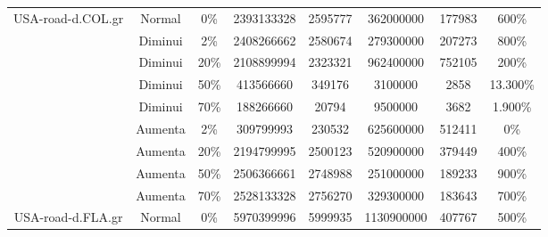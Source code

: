 \begin{table}[H]
\begin{adjustbox}{max width=\textwidth}
\begin{tabular}{|c|c|c|c|c|c|c|c|}
\multirow{9}{*}{USA-road-d.COL.gr} & Normal        & 0\%                                         & 2393133328        & 2595777         & 362000000          & 177983           & 600\%                           \\ \cline{2-8} 
                                   & Diminui       & 2\%                                         & 2408266662        & 2580674         & 279300000          & 207273           & 800\%                           \\ \cline{2-8} 
                                   & Diminui       & 20\%                                        & 2108899994        & 2323321         & 962400000          & 752105           & 200\%                           \\ \cline{2-8} 
                                   & Diminui       & 50\%                                        & 413566660         & 349176          & 3100000            & 2858             & 13.300\%                        \\ \cline{2-8} 
                                   & Diminui       & 70\%                                        & 188266660         & 20794           & 9500000            & 3682             & 1.900\%                         \\ \cline{2-8} 
                                   & Aumenta       & 2\%                                         & 309799993         & 230532          & 625600000          & 512411           & 0\%                             \\ \cline{2-8} 
                                   & Aumenta       & 20\%                                        & 2194799995        & 2500123         & 520900000          & 379449           & 400\%                           \\ \cline{2-8} 
                                   & Aumenta       & 50\%                                        & 2506366661        & 2748988         & 251000000          & 189233           & 900\%                           \\ \cline{2-8} 
                                   & Aumenta       & 70\%                                        & 2528133328        & 2756270         & 329300000          & 183643           & 700\%                           \\ \hline
\multirow{9}{*}{USA-road-d.FLA.gr} & Normal        & 0\%                                         & 5970399996        & 5999935         & 1130900000         & 407767           & 500\%                           \\ \cline{2-8} 

\end{tabular}
\end{adjustbox}
\end{table}
